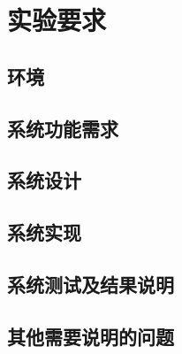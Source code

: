 
\section{实验要求}
\subsection{环境}


\subsection{系统功能需求}


\subsection{系统设计}


\subsection{系统实现}


\subsection{系统测试及结果说明}


\subsection{其他需要说明的问题}

